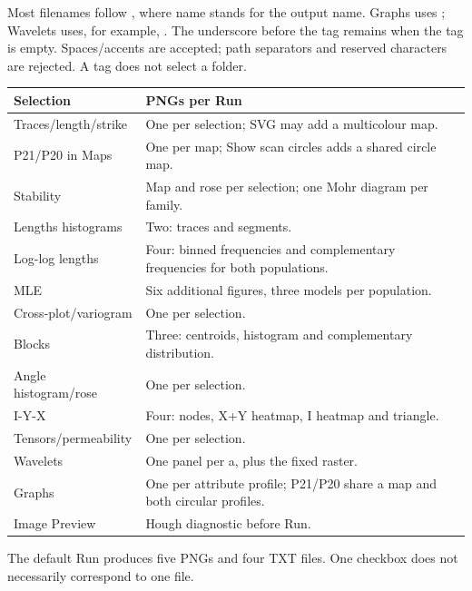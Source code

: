 Most filenames follow , where name stands for the output name. Graphs uses ; Wavelets uses, for example, . The underscore before the tag remains when the tag is empty. Spaces/accents are accepted; path separators and reserved characters are rejected. A tag does not select a folder.
\begin{longtable}{@{}p{.29\linewidth}p{.63\linewidth}@{}}
\toprule Selection & PNGs per Run\\\midrule\endhead
Traces/length/strike & One per selection; SVG may add a multicolour map.\\
P21/P20 in Maps & One per map; Show scan circles adds a shared circle map.\\
Stability & Map and rose per selection; one Mohr diagram per family.\\
Lengths histograms & Two: traces and segments.\\
Log-log lengths & Four: binned frequencies and complementary frequencies for both populations.\\
MLE & Six additional figures, three models per population.\\
Cross-plot/variogram & One per selection.\\
Blocks & Three: centroids, histogram and complementary distribution.\\
Angle histogram/rose & One per selection.\\
I-Y-X & Four: nodes, X+Y heatmap, I heatmap and triangle.\\
Tensors/permeability & One per selection.\\
Wavelets & One panel per a, plus the fixed raster.\\
Graphs & One per attribute profile; P21/P20 share a map and both circular profiles.\\
Image Preview & Hough diagnostic before Run.\\\bottomrule
\end{longtable}
The default Run produces five PNGs and four TXT files. One checkbox does not necessarily correspond to one file.


